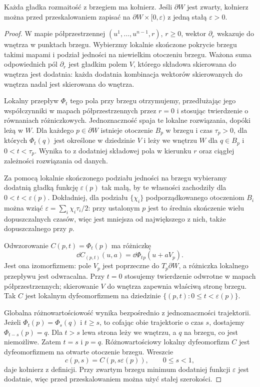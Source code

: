 \begin{twierdzenie}
\label{thm:kolnierz-15}
Każda gładka rozmaitość z brzegiem
ma kołnierz. Jeśli $\partial W$ jest
zwarty, kołnierz można przed
przeskalowaniem zapisać na
$\partial W\times[0,\varepsilon)$
z jedną stałą $\varepsilon>0$.
\end{twierdzenie}
\begin{proof}
W mapie półprzestrzennej
$(u^1,\ldots,u^{n-1},r)$, $r\geq0$,
wektor $\partial_r$ wskazuje do
wnętrza w punktach brzegu. Wybierzmy
lokalnie skończone pokrycie brzegu
takimi mapami i podział jedności
na niewielkim otoczeniu brzegu.
Ważona suma odpowiednich pól
$\partial_r$ jest gładkim polem
$V$, którego składowa skierowana
do wnętrza jest dodatnia:
każda dodatnia kombinacja
wektorów skierowanych do wnętrza
nadal jest skierowana do wnętrza.

Lokalny przepływ $\Phi_t$ tego pola przy brzegu
otrzymujemy, przedłużając jego współczynniki
w mapach półprzestrzennych przez $r=0$ i stosując
twierdzenie o równaniach różniczkowych. Jednoznaczność
spaja te lokalne rozwiązania, dopóki leżą w $W$.
Dla każdego $p\in\partial W$ istnieje otoczenie
$B_p$ w brzegu i czas $\tau_p>0$, dla których
$\Phi_t(q)$ jest określone w dziedzinie $V$
i leży we wnętrzu $W$ dla $q\in B_p$ i $0<t<\tau_p$.
Wynika to z dodatniej składowej pola w kierunku $r$
oraz ciągłej zależności rozwiązania od danych.

Za pomocą lokalnie skończonego podziału jedności
na brzegu wybieramy dodatnią gładką funkcję
$\varepsilon(p)$ tak małą, by te własności zachodziły
dla $0<t<\varepsilon(p)$. Dokładniej, dla podziału
$\{\chi_i\}$ podporządkowanego otoczeniom $B_i$
można wziąć $\varepsilon=\sum_i\chi_i\tau_i/2$:
przy ustalonym $p$ jest to średnia skończenie wielu
dopuszczalnych czasów, więc jest mniejsza od
największego z nich, także dopuszczalnego przy $p$.

Odwzorowanie $C(p,t)=\Phi_t(p)$ ma różniczkę
\[
 \dd C_{(p,t)}(u,a)=\dd\Phi_t{}_p(u+aV_p).
\]
Jest ona izomorfizmem: pole $V_p$ jest poprzeczne
do $T_p\partial W$, a różniczka lokalnego przepływu
jest odwracalna. Przy $t=0$ stosujemy twierdzenie
odwrotne w mapach półprzestrzennych; skierowanie
$V$ do wnętrza zapewnia właściwą stronę brzegu.
Tak $C$ jest lokalnym dyfeomorfizmem na dziedzinie
$\{(p,t):0\leq t<\varepsilon(p)\}$.

Globalna różnowartościowość wynika bezpośrednio
z jednoznaczności trajektorii. Jeżeli
$\Phi_t(p)=\Phi_s(q)$ i $t\geq s$, to cofając
obie trajektorie o czas $s$, dostajemy
$\Phi_{t-s}(p)=q$. Dla $t>s$ lewa strona
leży we wnętrzu, a $q$ na brzegu, co jest
niemożliwe. Zatem $t=s$ i $p=q$.
Różnowartościowy lokalny dyfeomorfizm $C$ jest
dyfeomorfizmem na otwarte otoczenie brzegu.
Wreszcie
\[
 c(p,s)=C(p,s\varepsilon(p)),\qquad 0\leq s<1,
\]
daje kołnierz z definicji. Przy zwartym brzegu
minimum dodatniej funkcji $\varepsilon$ jest dodatnie,
więc przed przeskalowaniem można użyć stałej szerokości.
\end{proof}

